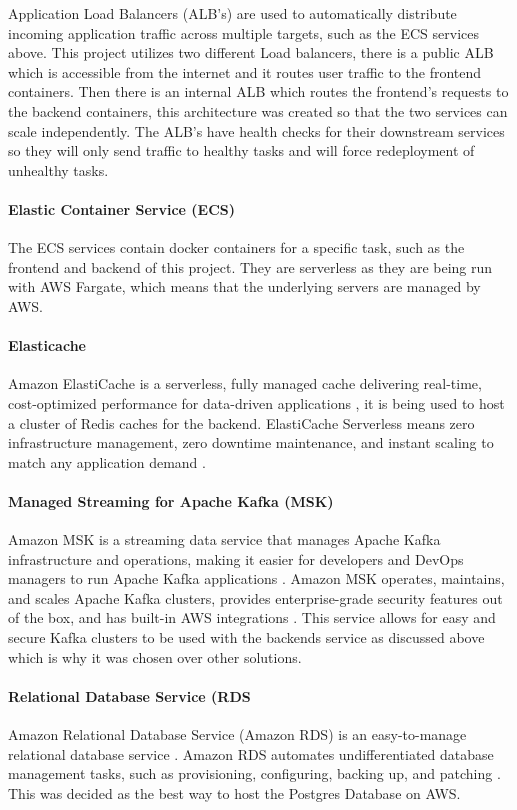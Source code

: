 \documentclass[]{project_report}
\begin{document}
Application Load Balancers (ALB's) are used to automatically distribute incoming application traffic across multiple targets, such as the ECS services above. This project utilizes two different Load balancers, there is a public ALB which is accessible from the internet and it routes user traffic to the frontend containers. Then there is an internal ALB which routes the frontend's requests to the backend containers, this architecture was created so that the two services can scale independently. The ALB's have health checks for their downstream services so they will only send traffic to healthy tasks and will force redeployment of unhealthy tasks.

\paragraph{Elastic Container Service (ECS)}
The ECS services contain docker containers for a specific task, such as the frontend and backend of this project. They are serverless as they are being run with AWS Fargate, which means that the underlying servers are managed by AWS.

\paragraph{Elasticache}
Amazon ElastiCache is a serverless, fully managed cache delivering real-time, cost-optimized performance for data-driven applications \cite{aws_cache}, it is being used to host a cluster of Redis caches for the backend. ElastiCache Serverless means zero infrastructure management, zero downtime maintenance, and instant scaling to match any application demand \cite{aws_cache}. 

\paragraph{Managed Streaming for Apache Kafka (MSK)}
Amazon MSK is a streaming data service that manages Apache Kafka infrastructure and operations, making it easier for developers and DevOps managers to run Apache Kafka applications \cite{aws_msk}. Amazon MSK operates, maintains, and scales Apache Kafka clusters, provides enterprise-grade security features out of the box, and has built-in AWS integrations \cite{aws_msk}. This service allows for easy and secure Kafka clusters to be used with the backends service as discussed above which is why it was chosen over other solutions.

\paragraph{Relational Database Service (RDS}
Amazon Relational Database Service (Amazon RDS) is an easy-to-manage relational database service \cite{aws_rds}. Amazon RDS automates undifferentiated database management tasks, such as provisioning, configuring, backing up, and patching \cite{aws_rds}. This was decided as the best way to host the Postgres Database on AWS.
\end{document}
